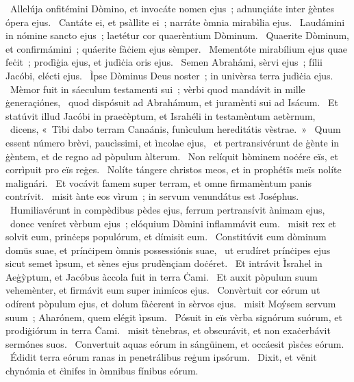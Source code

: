 {~Allelúja}
{%
onfitémini Dòmino, et invocáte nomen ejus~; adnunçiáte inter ġèntes ópera ejus.
~Cantáte ei, et psàllite ei~; narráte òmnia mirabìlia ejus.
~Laudámini in nómine sancto ejus~; laetétur cor quaerèntium Dòminum.
~Quaerite Dòminum, et confirmámini~; quáerite fàċiem ejus sèmper.
~Mementóte mirabílium ejus quae feċit~; prodìġia ejus, et judìċia oris ejus.
~Semen Abrahámi, sèrvi ejus~; fílii Jacóbi, elécti ejus.
~Ìpse Dòminus Deus noster~; in univèrsa terra judìċia ejus.
~Mèmor fuit in sáeculum testamenti sui~; vèrbi quod mandávit in mille ġeneraçiónes,
~quod dispósuit ad Abrahámum, et juramènti sui ad Isácum.
~Et statúvit illud Jacóbi in praeċèptum, et Israhéli in testamèntum aetèrnum,
~dicens, «~Tìbi dabo terram Canaánis, funìculum hereditátis vèstrae.~»
~Quum essent número brèvi, paucìssimi, et ìncolae ejus,
~et pertransivérunt de ġènte in ġèntem, et de regno ad pòpulum àlterum.
~Non relíquit hòminem noċére eïs, et corrìpuit pro eïs reġes.
~Nolíte tángere christos meos, et in prophétïs meïs nolíte malignári.
~Et vocávit famem super terram, et omne firmamèntum panis contrívit.
~misit ànte eos vìrum~; in servum venundátus est Joséphus.
~Humiliavérunt in compèdibus pèdes ejus, ferrum pertransívit ànimam ejus,
~donec veníret vèrbum ejus~; elóquium Dòmini inflammávit eum.
~misit rex et solvit eum, prinċeps populórum, et dímisit eum.
~Constitúvit eum dòminum domüs suae, et prínċipem òmnis possessiónis suae,
~ut erudíret prínċipes ejus sicut semet ìpsum, et sènes ejus prudènçiam doċéret.
~Et intrávit Ìsrahel in Aeġỳptum, et Jacóbus àccola fuit in terra Ċami.
~Et auxit pòpulum suum vehemènter, et firmávit eum super inimícos ejus.
~Convèrtuit cor eórum ut odírent pòpulum ejus, et dolum fàċerent in sèrvos ejus.
~misit Moýsem servum suum~; Aharónem, quem elégit ìpsum.
~Pósuit in eïs vèrba signórum suórum, et prodiġiórum in terra Ċami.
~misit tènebras, et obscurávit, et non exaċerbávit sermónes suos.
~Convertuit aquas eórum in sángüinem, et occáesit pìsċes eórum.
~Édidit terra eórum ranas in penetrálibus reġum ipsórum.
~Dixit, et vënit chynómia et ċìnifes in òmnibus fínibus eórum.
}
